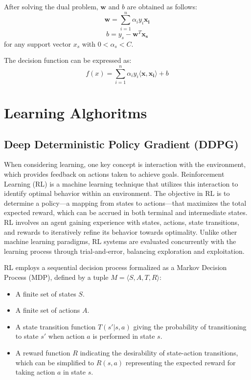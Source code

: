 After solving the dual problem, \(\mathbf{w}\) and \(b\) are obtained as follows:
\[
\mathbf{w} = \sum_{i=1}^{n} \alpha_i y_i \mathbf{x_i}
\]
\[
b = y_s - \mathbf{w}^T \mathbf{x_s}
\]
for any support vector \(x_s\) with \(0 < \alpha_s < C\).

The decision function can be expressed as:
\[
f(x) = \sum_{i=1}^{n} \alpha_i y_i \langle \mathbf{x}, \mathbf{x_i} \rangle + b
\]

\newpage

\section{Learning Alghoritms}


\subsection*{Deep Deterministic Policy Gradient (DDPG)}

When considering learning, one key concept is interaction with the environment, which provides feedback on actions taken to achieve goals. Reinforcement Learning (RL) is a machine learning technique that utilizes this interaction to identify optimal behavior within an environment. The objective in RL is to determine a policy—a mapping from states to actions—that maximizes the total expected reward, which can be accrued in both terminal and intermediate states. RL involves an agent gaining experience with states, actions, state transitions, and rewards to iteratively refine its behavior towards optimality. Unlike other machine learning paradigms, RL systems are evaluated concurrently with the learning process through trial-and-error, balancing exploration and exploitation.

RL employs a sequential decision process formalized as a Markov Decision Process (MDP), defined by a tuple \( M = \langle S,A,T,R \rangle \):
\begin{itemize}
	\item A finite set of states \( S \).
	\item A finite set of actions \( A \).
	\item A state transition function \( T(s' | s,a) \) giving the probability of transitioning to state \( s' \) when action \( a \) is performed in state \( s \).
	\item A reward function \( R \) indicating the desirability of state-action transitions, which can be simplified to \( R(s,a) \) representing the expected reward for taking action \( a \) in state \( s \).
\end{itemize}

